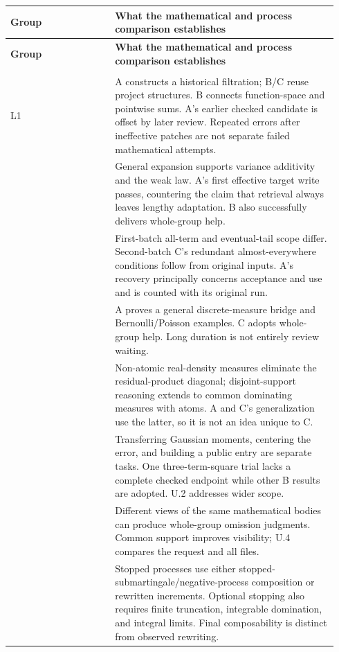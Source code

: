 \begingroup\small\setlength{\tabcolsep}{3pt}\renewcommand{\arraystretch}{1.14}
\begin{longtable}{>{\raggedright\arraybackslash}p{0.3\linewidth}>{\raggedright\arraybackslash}p{0.64\linewidth}}
\toprule
\textbf{Group} & \textbf{What the mathematical and process comparison establishes}\\\midrule\endfirsthead
\toprule
\textbf{Group} & \textbf{What the mathematical and process comparison establishes}\\\midrule\endhead
\midrule\multicolumn{2}{r}{\small Continued on next page}\\\endfoot\bottomrule\endlastfoot
{L1} & {A constructs a historical filtration; B/C reuse project structures. B connects function-space and pointwise sums. A's earlier checked candidate is offset by later review. Repeated errors after ineffective patches are not separate failed mathematical attempts.}\\
{L2} & {General expansion supports variance additivity and the weak law. A's first effective target write passes, countering the claim that retrieval always leaves lengthy adaptation. B also successfully delivers whole-group help.}\\
{L3} & {First-batch all-term and eventual-tail scope differ. Second-batch C's redundant almost-everywhere conditions follow from original inputs. A's recovery principally concerns acceptance and use and is counted with its original run.}\\
{L4} & {A proves a general discrete-measure bridge and Bernoulli/Poisson examples. C adopts whole-group help. Long duration is not entirely review waiting.}\\
{L5} & {Non-atomic real-density measures eliminate the residual-product diagonal; disjoint-support reasoning extends to common dominating measures with atoms. A and C's generalization use the latter, so it is not an idea unique to C.}\\
{L6} & {Transferring Gaussian moments, centering the error, and building a public entry are separate tasks. One three-term-square trial lacks a complete checked endpoint while other B results are adopted. U.2 addresses wider scope.}\\
{L7} & {Different views of the same mathematical bodies can produce whole-group omission judgments. Common support improves visibility; U.4 compares the request and all files.}\\
{M1} & {Stopped processes use either stopped-submartingale/negative-process composition or rewritten increments. Optional stopping also requires finite truncation, integrable domination, and integral limits. Final composability is distinct from observed rewriting.}\\

\end{longtable}

